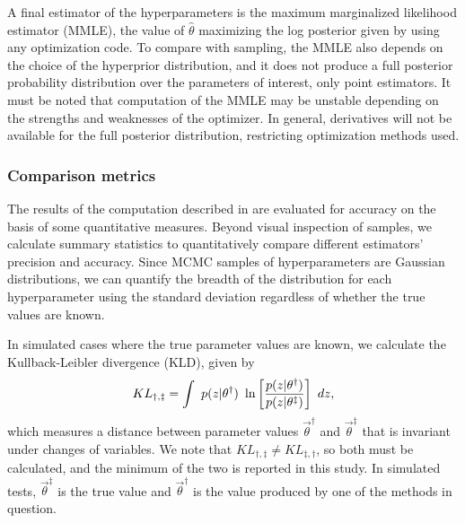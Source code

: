 A final estimator of the hyperparameters is the maximum marginalized likelihood estimator (MMLE), the value of $\hat{\theta}$ maximizing the log posterior given by  using any optimization code.  
To compare with sampling, the MMLE also depends on the choice of the hyperprior distribution, and it does not produce a full posterior probability distribution over the 
parameters of interest, only point estimators.  
It must be noted that computation of the MMLE may be unstable depending on the strengths and weaknesses of the optimizer.  
In general, derivatives will not be available for the full posterior distribution, restricting optimization methods used.

\subsubsection{Comparison metrics}

The results of the computation described in  are evaluated for accuracy on the basis of some quantitative measures.  
Beyond visual inspection of samples, we calculate summary statistics to quantitatively compare different estimators' precision and accuracy.  
Since MCMC samples of hyperparameters are Gaussian distributions, we can quantify the breadth of the distribution for each hyperparameter using the standard deviation regardless of whether the true values are known.  

In simulated cases where the true parameter values are known, we calculate the Kullback-Leibler divergence (KLD), given by 
\begin{equation}
\eqlabel{eq:kl}
KL_{\dagger,\ddagger} = \int\ p(z|\theta^{\dagger})\ \ln\left[\frac{p(z|\theta^{\dagger})}{p(z|\theta^{\ddagger})}\right]\ dz,
\end{equation}
which measures a distance between parameter values $\vec{\theta}^{\dagger}$ and $\vec{\theta}^{\ddagger}$ that is invariant under changes of variables.  
We note that $KL_{\dagger,\ddagger}\neq KL_{\ddagger,\dagger}$, so both must be calculated, and the minimum of the two is reported in this study.  
In simulated tests, $\vec{\theta}^{\ddagger}$ is the true value and $\vec{\theta}^{\dagger}$ is the value produced by one of the methods in question.  

